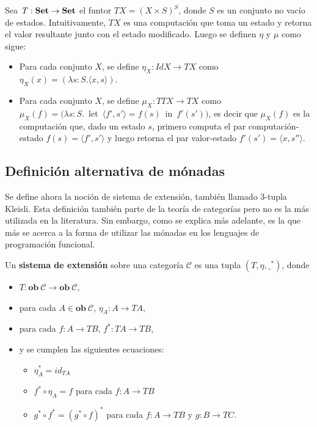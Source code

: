 \begin{ejemplo}
Sea $\mathit{T} : \text{\bf Set} \rightarrow \text{\bf Set}$ el funtor $\mathit{T} X = (X \times S)^S$, donde $S$ es un conjunto no vacío de estados. Intuitivamente, $\mathit{T} X$ es una computación que toma un estado y retorna el valor resultante junto con el estado modificado. Luego se definen $\eta$ y $\mu$ como sigue:
\begin{itemize}[noitemsep, label=$\blacktriangleright$]
	\item Para cada conjunto $X$, se define $\eta_X : \mathit{Id} X \rightarrow \mathit{T} X$ como $\eta_X (x) = (\lambda s : S . \langle x , s \rangle)$.
	\item Para cada conjunto $X$, se define $\mu_X : \mathit{T T} X \rightarrow \mathit{T} X$ como \\ \mbox{$\mu_X (f) = (\lambda s : S .$ let $\langle f' , s' \rangle = f(s)$ in $f'(s'))$}, es decir que $\mu_X (f)$ es la computación que, dado un estado $s$, primero computa el par computación-estado $f(s) = \langle f' , s' \rangle$ y luego retorna el par valor-estado $f'(s') = \langle x , s'' \rangle$.   
\end{itemize}
\end{ejemplo}

\subsection{Definición alternativa de mónadas}\label{monadas:alt}

Se define ahora la noción de sistema de extensión, también llamado 3-tupla Kleisli. Esta definición también parte de la teoría de categorías pero no es la más utilizada en la literatura. Sin embargo, como se explica más adelante, es la que más se acerca a la forma de utilizar las mónadas en los lenguajes de programación funcional. 

\begin{definition}\label{def:sistext}
Un \textbf{sistema de extensión} sobre una categoría $\mathscr{C}$ es una tupla $(\mathit{T},\eta,\_^*)$, donde 
\begin{itemize}[noitemsep,label=$\blacktriangleright$]
	\item $\mathit{T} : \mathbf{ob} \ \mathscr{C} \rightarrow \mathbf{ob} \ \mathscr{C}$,
	\item para cada $A \in \mathbf{ob} \ \mathscr{C}$, $\eta_A : A \rightarrow \mathit{T}A$,
	\item para cada $f : A \rightarrow \mathit{T}B$,  $f^* : \mathit{T}A \rightarrow \mathit{T}B$,
	\item y se cumplen las siguientes ecuaciones:
	\begin{itemize}[noitemsep,label=$\bullet$]
		\item $\eta^*_A = id_{\mathit{T}A}$
		\item $f^* \circ \eta_A = f$ para cada $f : A \rightarrow \mathit{T}B$
		\item $g^* \circ f^* = (g^* \circ f)^*$ para cada $f : A \rightarrow \mathit{T}B$ y $g : B \rightarrow \mathit{T}C$.
	\end{itemize}
\end{itemize}
\end{definition}

